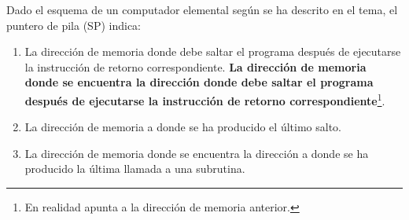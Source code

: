 \begin{ejercicio}\label{ej:1.Ejercicio4}
    Dado el esquema de un computador elemental según se ha descrito en el tema, el puntero de pila (SP) indica:
    
    \begin{enumerate}[label=(\alph*)]
      
      \item La dirección de memoria donde debe saltar el programa después de ejecutarse la instrucción de retorno correspondiente.
      \myitem \textbf{La dirección de memoria donde se encuentra la dirección donde debe saltar el programa después de 
      ejecutarse la instrucción de retorno correspondiente}\footnote{En realidad apunta a la dirección de memoria anterior.}.
      \item La dirección de memoria a donde se ha producido el último salto.
      \item La dirección de memoria donde se encuentra la dirección a donde se ha producido la última llamada a una subrutina.
    \end{enumerate}
    
\end{ejercicio}





	
